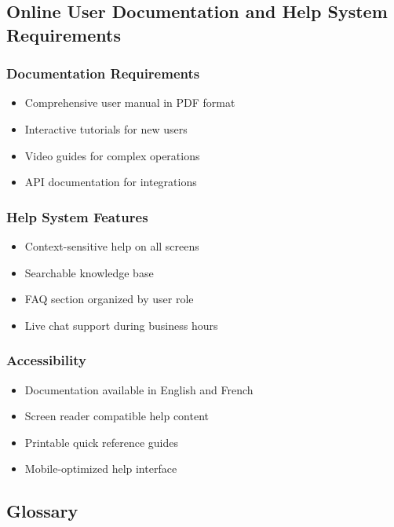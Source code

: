\documentclass[12pt]{article}
\begin{document}
\subsection{Online User Documentation and Help System Requirements}

\subsubsection{Documentation Requirements}
\begin{itemize}
    \item Comprehensive user manual in PDF format
    \item Interactive tutorials for new users
    \item Video guides for complex operations
    \item API documentation for integrations
\end{itemize}

\subsubsection{Help System Features}
\begin{itemize}
    \item Context-sensitive help on all screens
    \item Searchable knowledge base
    \item FAQ section organized by user role
    \item Live chat support during business hours
\end{itemize}

\subsubsection{Accessibility}
\begin{itemize}
    \item Documentation available in English and French
    \item Screen reader compatible help content
    \item Printable quick reference guides
    \item Mobile-optimized help interface
\end{itemize}

\subsection{Glossary}
\end{document}
